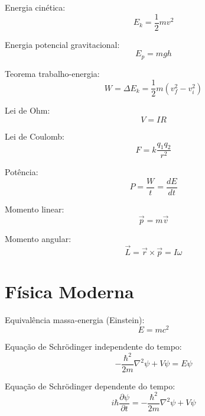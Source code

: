 Energia cinética:
\begin{equation}
E_k = \frac{1}{2}mv^2
\end{equation}

Energia potencial gravitacional:
\begin{equation}
E_p = mgh
\end{equation}

Teorema trabalho-energia:
\begin{equation}
W = \Delta E_k = \frac{1}{2}m(v_f^2 - v_i^2)
\end{equation}

Lei de Ohm:
\begin{equation}
V = IR
\end{equation}

Lei de Coulomb:
\begin{equation}
F = k\frac{q_1 q_2}{r^2}
\end{equation}

Potência:
\begin{equation}
P = \frac{W}{t} = \frac{dE}{dt}
\end{equation}

Momento linear:
\begin{equation}
\vec{p} = m\vec{v}
\end{equation}

Momento angular:
\begin{equation}
\vec{L} = \vec{r} \times \vec{p} = I\omega
\end{equation}


\section{Física Moderna}

Equivalência massa-energia (Einstein):
\begin{equation}
E = mc^2
\end{equation}

Equação de Schrödinger independente do tempo:
\begin{equation}
-\frac{\hbar^2}{2m}\nabla^2\psi + V\psi = E\psi
\end{equation}

Equação de Schrödinger dependente do tempo:
\begin{equation}
i\hbar\frac{\partial\psi}{\partial t} = -\frac{\hbar^2}{2m}\nabla^2\psi + V\psi
\end{equation}

